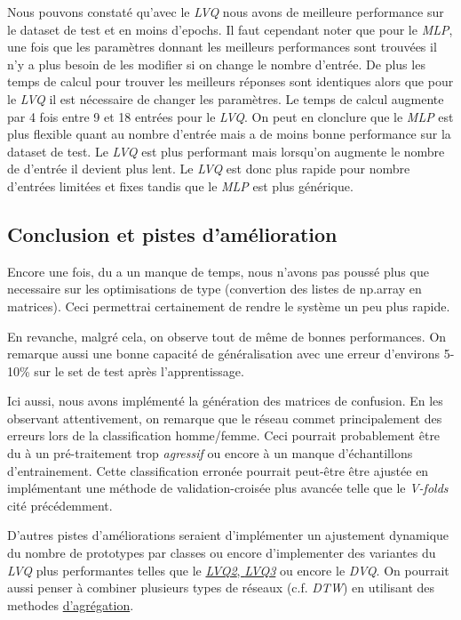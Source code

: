 \documentclass[11pt]{article}
\begin{document}
Nous pouvons constat\'e qu'avec le {\em LVQ} nous avons de meilleure
performance sur le dataset de test et en moins d'epochs. Il faut cependant
noter que pour le {\em MLP}, une fois que les param\`etres donnant les
meilleurs performances sont trouv\'ees il n'y a plus besoin de les modifier si
on change le nombre d'entr\'ee. De plus les temps de calcul pour trouver les
meilleurs r\'eponses
sont identiques alors que pour le {\em LVQ} il est n\'ecessaire de changer les
param\`etres. Le temps de calcul augmente par 4 fois entre 9 et 18 entr\'ees pour
le {\em LVQ}. On peut en clonclure que le {\em MLP} est plus flexible quant au
nombre d'entr\'ee mais a de moins bonne performance sur la dataset de test. Le
{\em LVQ} est plus performant mais lorsqu'on augmente le nombre de d'entr\'ee il devient
plus lent.
Le {\em LVQ} est donc plus rapide pour nombre d'entr\'ees limit\'ees et fixes
tandis que le {\em MLP} est plus g\'en\'erique.

\subsection{Conclusion et pistes d'am\'elioration}
Encore une fois, du a un manque de temps, nous n'avons pas pouss\'e plus que
necessaire sur les optimisations de type (convertion des listes de np.array en
matrices). Ceci permettrai certainement de rendre le syst\`eme un peu plus
rapide.

En revanche, malgr\'e cela, on observe tout de m\^eme de bonnes performances.
On remarque aussi une bonne capacit\'e de g\'en\'eralisation avec une erreur
d'environs 5-10\% sur le set de test apr\`es l'apprentissage.

Ici aussi, nous avons impl\'ement\'e la g\'en\'eration des matrices de confusion.
En les observant attentivement, on remarque que le r\'eseau commet
principalement des erreurs lors de la classification homme/femme. Ceci pourrait
probablement \^etre du \`a un pr\'e-traitement trop {\em agressif} ou encore \`a
un manque d'\'echantillons d'entrainement. Cette classification erron\'ee
pourrait peut-\^etre \^etre ajust\'ee en impl\'ementant une m\'ethode de
validation-crois\'ee plus avanc\'ee telle que le {\em V-folds}
cit\'e pr\'ec\'edemment.

D'autres pistes d'am\'eliorations seraient d'impl\'ementer un ajustement dynamique
du nombre de prototypes par classes ou encore d'implementer des variantes du
{\em LVQ} plus performantes telles que le
\href{http://www.cis.hut.fi/research/lvq_pak/lvq_doc.txt}{{\em LVQ2}, {\em LVQ3}}
ou encore le {\em DVQ}.
On pourrait aussi penser \`a combiner plusieurs types de r\'eseaux (c.f. {\em DTW})
en utilisant des methodes \href{http://work.caltech.edu/slides/slides18.pdf}{d'agr\'egation}. 
\end{document}
